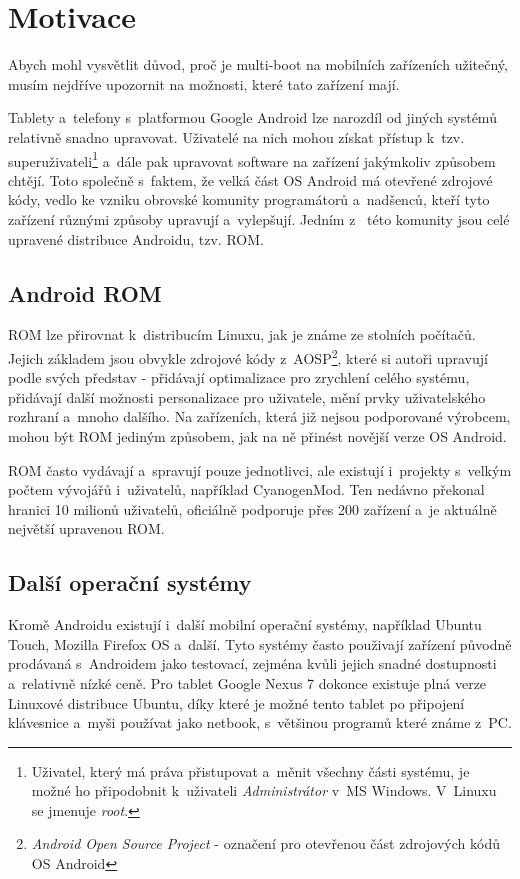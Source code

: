 \documentclass[12pt, a4paper, oneside]{article}
\newcommand{\It}{\textit}  %
\begin{document}
\newpage
\section{Motivace}
Abych mohl vysvětlit důvod, proč je multi-boot na mobilních zařízeních užitečný, musím nejdříve upozornit na možnosti, které tato zařízení mají.

Tablety a~telefony s~platformou Google Android lze narozdíl od jiných systémů relativně snadno upravovat. Uživatelé na nich mohou získat přístup k~tzv. superuživateli\footnote{Uživatel, který má práva přistupovat a~měnit všechny části systému, je možné ho připodobnit k~uživateli \It{Administrátor} v~MS Windows. V~Linuxu se jmenuje \It{root}.} a~dále pak upravovat software na zařízení jakýmkoliv způsobem chtějí. Toto společně s~faktem, že velká část OS Android má otevřené zdrojové kódy, vedlo ke vzniku obrovské komunity programátorů a~nadšenců, kteří tyto zařízení různými způsoby upravují a~vylepšují. Jedním z~ této komunity jsou celé upravené distribuce Androidu, tzv. ROM.

\subsection{Android ROM}
ROM lze přirovnat k~distribucím Linuxu, jak je známe ze stolních počítačů. Jejich základem jsou obvykle zdrojové kódy z~AOSP\cite{aosp}\footnote{\It{Android Open Source Project} - označení pro otevřenou část zdrojových kódů OS Android}, které si autoři upravují podle svých představ - přidávají optimalizace pro zrychlení celého systému, přidávají další možnosti personalizace pro uživatele, mění prvky uživatelského rozhraní a~mnoho dalšího. Na zařízeních, která již nejsou podporované výrobcem, mohou být ROM jediným způsobem, jak na ně přinést novější verze OS Android.

ROM často vydávají a~spravují pouze jednotlivci, ale existují i~projekty s~velkým počtem vývojářů i~uživatelů, například CyanogenMod\cite{CM}. Ten nedávno překonal hranici 10 milionů uživatelů, oficiálně podporuje přes 200 zařízení a~je aktuálně největší upravenou ROM.

\subsection{Další operační systémy}
Kromě Androidu existují i~další mobilní operační systémy, například Ubuntu Touch\cite{utouch}, Mozilla Firefox OS\cite{firefoxos} a~další. Tyto systémy často použivají zařízení původně prodávaná s~Androidem jako testovací, zejména kvůli jejich snadné dostupnosti a~relativně nízké ceně. Pro tablet Google Nexus 7 dokonce existuje plná verze Linuxové distribuce Ubuntu, díky které je možné tento tablet po připojení klávesnice a~myši používat jako netbook, s~většinou programů které známe z~PC.
\end{document}
